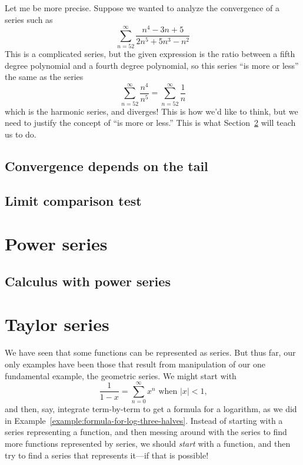 \documentclass[justified]{tufte-book}
\newcommand{\xrefn}[1]{\ref{#1}}
\begin{document}
Let me be more precise.  Suppose we wanted to analyze the convergence of a series such as
\[
\sum_{n=52}^\infty \frac{n^4 - 3n + 5}{2n^5 + 5n^3 - n^2}
\]
This is a complicated series, but the given expression is the ratio
between a fifth degree polynomial and a fourth degree polynomial, so this series ``is more or less'' the same as the series
\[
\sum_{n=52}^\infty \frac{n^4}{n^5} = \sum_{n=52}^\infty \frac{1}{n}
\]
which is the harmonic series, and diverges!  This is how we'd like to
think, but we need to justify the concept of ``is more or less.''
This is what Section~\xrefn{section:limit-comparison-test} will teach
us to do.

\section{Convergence depends on the tail}
\label{section:convergence-for-tails}


\section{Limit comparison test}
\label{section:limit-comparison-test}


\chapter{Power series}
\label{chapter:power-series}



\section{Calculus with power series}
\label{section:calculus-with-power-series}


\chapter{Taylor series}
\label{chapter:taylor-series}

We have seen that some functions can be represented as
series.  But thus far, our only examples have been those that result
from manipulation of our one fundamental example, the geometric
series.  We might start with
$$
\frac{1}{1-x} = \sum_{n=0}^\infty x^n \mbox{ when $|x| < 1$,}
$$
and then, say, integrate term-by-term to get a formula for a
logarithm, as we did in
Example~\xrefn{example:formula-for-log-three-halves}.  Instead of
starting with a series representing a function, and then messing
around with the series to find more functions represented by series,
we should \textit{start} with a function, and then try to find a
series that represents it---if that is possible!
\end{document}
